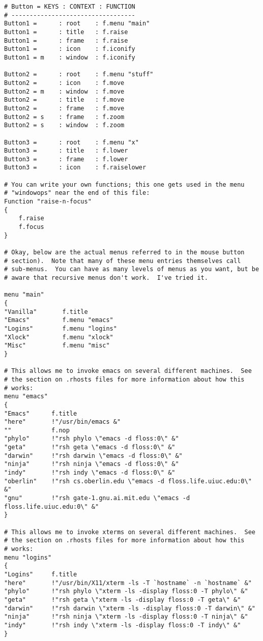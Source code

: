\begin{screen}
\begin{verbatim}
# Button = KEYS : CONTEXT : FUNCTION
# ----------------------------------
Button1 =      : root    : f.menu "main"
Button1 =      : title   : f.raise
Button1 =      : frame   : f.raise
Button1 =      : icon    : f.iconify
Button1 = m    : window  : f.iconify

Button2 =      : root    : f.menu "stuff"
Button2 =      : icon    : f.move
Button2 = m    : window  : f.move
Button2 =      : title   : f.move
Button2 =      : frame   : f.move
Button2 = s    : frame   : f.zoom
Button2 = s    : window  : f.zoom

Button3 =      : root    : f.menu "x"
Button3 =      : title   : f.lower
Button3 =      : frame   : f.lower
Button3 =      : icon    : f.raiselower

# You can write your own functions; this one gets used in the menu
# "windowops" near the end of this file:
Function "raise-n-focus"
{
    f.raise
    f.focus
}

# Okay, below are the actual menus referred to in the mouse button
# section).  Note that many of these menu entries themselves call
# sub-menus.  You can have as many levels of menus as you want, but be
# aware that recursive menus don't work.  I've tried it. 

menu "main"
{
"Vanilla"       f.title
"Emacs"         f.menu "emacs"
"Logins"        f.menu "logins"
"Xlock"         f.menu "xlock"
"Misc"          f.menu "misc"
}

# This allows me to invoke emacs on several different machines.  See
# the section on .rhosts files for more information about how this
# works: 
menu "emacs"
{
"Emacs"      f.title
"here"       !"/usr/bin/emacs &"
""           f.nop
"phylo"      !"rsh phylo \"emacs -d floss:0\" &"
"geta"       !"rsh geta \"emacs -d floss:0\" &"
"darwin"     !"rsh darwin \"emacs -d floss:0\" &"
"ninja"      !"rsh ninja \"emacs -d floss:0\" &"
"indy"       !"rsh indy \"emacs -d floss:0\" &"
"oberlin"    !"rsh cs.oberlin.edu \"emacs -d floss.life.uiuc.edu:0\" &"
"gnu"        !"rsh gate-1.gnu.ai.mit.edu \"emacs -d floss.life.uiuc.edu:0\" &"
}

# This allows me to invoke xterms on several different machines.  See
# the section on .rhosts files for more information about how this
# works: 
menu "logins"
{
"Logins"     f.title
"here"       !"/usr/bin/X11/xterm -ls -T `hostname` -n `hostname` &"
"phylo"      !"rsh phylo \"xterm -ls -display floss:0 -T phylo\" &"
"geta"       !"rsh geta \"xterm -ls -display floss:0 -T geta\" &"
"darwin"     !"rsh darwin \"xterm -ls -display floss:0 -T darwin\" &"
"ninja"      !"rsh ninja \"xterm -ls -display floss:0 -T ninja\" &"
"indy"       !"rsh indy \"xterm -ls -display floss:0 -T indy\" &"
}


\end{verbatim}
\end{screen}
